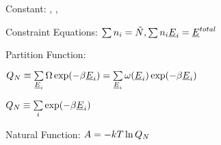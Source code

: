 \begin{bigmdframed}

    
\begin{listone}
    
    \item Constant: \nummoles, \uline{\vol}, \Temp
    
    \item Constraint Equations: $\sum\nolimits n_{i} = \tilde{\nummoles}, \sum\nolimits n_{i}\uline{\energy}_{i} = \uline{\energy}^{total}  $     %
    
    \item Partition Function:
    
    \begin{listtwo}
    
    	\item $\cpf \equiv \sum\limits_{\uline{\energy}_{i}} \mpc\exp(-\boltznorm\uline{\energy}_{i}) = \sum\limits_{\uline{\energy}_{i}} \mpf(\uline{\energy}_{i})\exp(-\boltznorm\uline{\energy}_{i}) $
    
    	\item $\cpf \equiv \sum\limits_{i} \exp(-\boltznorm\uline{\energy}_{i}) $
           
    \end{listtwo}
           
    \item Natural Function: $\helmholtz = -\thermcond\Temp\ln\cpf$
    
\end{listone}
    
\end{bigmdframed}